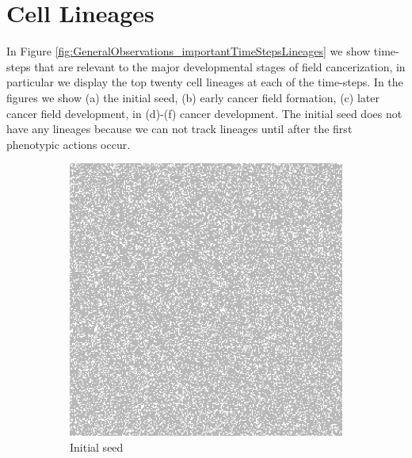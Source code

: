 \documentclass[\main/thesis.tex]{subfiles}
\begin{document}
\section{Cell Lineages}
In Figure \ref{fig:GeneralObservations_importantTimeStepsLineages} we show time-steps that are relevant to the major developmental stages of field cancerization, in particular we display the top twenty cell lineages at each of the time-steps. In the figures we show (a) the initial seed, (b) early cancer field formation, (c) later cancer field development, in (d)-(f) cancer development. The initial seed does not have any lineages because we can not track lineages until after the first phenotypic actions occur.
\begin{figure}[H]
    \centering
    \begin{subfigure}[t]{.45\textwidth}
      \centering
      \includegraphics[width=\textwidth]{images/2_GeneralObservations/Fig6/1_init.jpeg}
      \caption{Initial seed}
      \label{fig:GeneralObservations_initSeedLineages}
    \end{subfigure}
    \begin{subfigure}[t]{.45\textwidth}
      \centering

\end{subfigure}
\end{figure}
\end{document}
